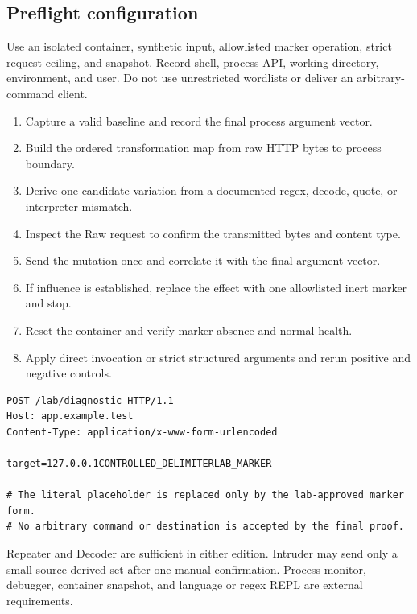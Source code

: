 \documentclass[11pt]{article}
\newcommand{\weekfield}[2]{%
  \Needspace{5\baselineskip}
  \subsection*{#1}
  #2
}
\begin{document}
\weekfield{Preflight configuration}{Use an isolated container, synthetic input,
allowlisted marker operation, strict request ceiling, and snapshot. Record shell,
process API, working directory, environment, and user. Do not use unrestricted
wordlists or deliver an arbitrary-command client.}

\begin{procedurebox}
\begin{enumerate}
  \item Capture a valid baseline and record the final process argument vector.
  \item Build the ordered transformation map from raw HTTP bytes to process boundary.
  \item Derive one candidate variation from a documented regex, decode, quote, or interpreter mismatch.
  \item Inspect the Raw request to confirm the transmitted bytes and content type.
  \item Send the mutation once and correlate it with the final argument vector.
  \item If influence is established, replace the effect with one allowlisted inert marker and stop.
  \item Reset the container and verify marker absence and normal health.
  \item Apply direct invocation or strict structured arguments and rerun positive and negative controls.
\end{enumerate}
\end{procedurebox}

\begin{lstlisting}[caption={Marker-only command-boundary test}]
POST /lab/diagnostic HTTP/1.1
Host: app.example.test
Content-Type: application/x-www-form-urlencoded

target=127.0.0.1CONTROLLED_DELIMITERLAB_MARKER

# The literal placeholder is replaced only by the lab-approved marker form.
# No arbitrary command or destination is accepted by the final proof.
\end{lstlisting}

\begin{editionbox}
Repeater and Decoder are sufficient in either edition. Intruder may send only a
small source-derived set after one manual confirmation. Process monitor, debugger,
container snapshot, and language or regex REPL are external requirements.
\end{editionbox}
\end{document}
